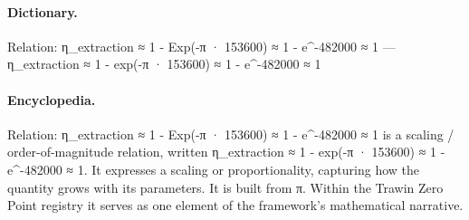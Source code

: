 \paragraph{Dictionary.}
Relation: η\_extraction ≈ 1 - Exp(-π · 153600) ≈ 1 - e\textasciicircum{}-482000 ≈ 1 — η\_extraction ≈ 1 - exp(-π · 153600) ≈ 1 - e\textasciicircum{}-482000 ≈ 1

\paragraph{Encyclopedia.}
Relation: η\_extraction ≈ 1 - Exp(-π · 153600) ≈ 1 - e\textasciicircum{}-482000 ≈ 1 is a scaling / order-of-magnitude relation, written η\_extraction ≈ 1 - exp(-π · 153600) ≈ 1 - e\textasciicircum{}-482000 ≈ 1. It expresses a scaling or proportionality, capturing how the quantity grows with its parameters. It is built from π. Within the Trawin Zero Point registry it serves as one element of the framework's mathematical narrative.
